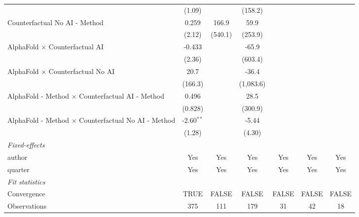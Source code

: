 \begin{tabular}{lcccccc}
                                                              & (1.09)       &         & (158.2)   &         &           &   \\   
   Counterfactual No AI - Method                              & 0.259        & 166.9   & 59.9      &         &           &   \\   
                                                              & (2.12)       & (540.1) & (253.9)   &         &           &   \\   
   AlphaFold $\times$ Counterfactual AI                       & -0.433       &         & -65.9     &         &           &   \\   
                                                              & (2.36)       &         & (603.4)   &         &           &   \\   
   AlphaFold $\times$ Counterfactual No AI                    & 20.7         &         & -36.4     &         &           &   \\   
                                                              & (166.3)      &         & (1,083.6) &         &           &   \\   
   AlphaFold - Method $\times$ Counterfactual AI - Method     & 0.496        &         & 28.5      &         &           &   \\   
                                                              & (0.828)      &         & (300.9)   &         &           &   \\   
   AlphaFold - Method $\times$ Counterfactual No AI - Method  & -2.60$^{**}$ &         & -5.44     &         &           &   \\   
                                                              & (1.28)       &         & (4.30)    &         &           &   \\   
   \midrule
   \emph{Fixed-effects}\\
   author                                                     & Yes          & Yes     & Yes       & Yes     & Yes       & Yes\\  
   quarter                                                    & Yes          & Yes     & Yes       & Yes     & Yes       & Yes\\  
   \midrule
   \emph{Fit statistics}\\
   Convergence                                                &TRUE          & FALSE   & FALSE     & FALSE   & FALSE     & FALSE\\  
   Observations                                               & 375          & 111     & 179       & 31      & 42        & 18\\  

\end{tabular}
